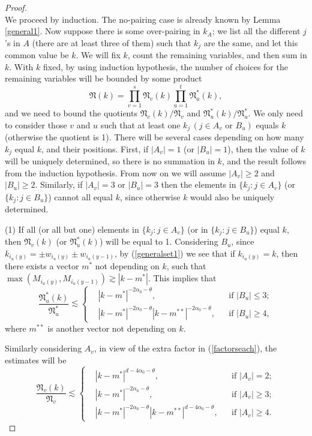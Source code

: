 \documentclass[11 pt,reqno]{amsart}
\theoremstyle{definition}
\theoremstyle{remark}
\numberwithin{equation}{section}
\newcommand{\Nf}{\mathfrak{N}}
\begin{document}
{\begin{proof}
\begin{equation}
\end{equation}We proceed by induction. The no-pairing case is already known by Lemma \ref{general1}. Now suppose there is some over-pairing in $k_A$; we list all the different $j$'s in $A$ (there are at least three of them) such that $k_j$ are the same, and let this common value be $k$. We will fix $k$, count the remaining variables, and then sum in $k$. With $k$ fixed, by using induction hypothesis, the number of choices for the remaining variables will be bounded by some product
\[\Nf(k)=\prod_{v=1}^s\Nf_v(k)\prod_{u=1}^t\Nf_u^*(k),\] and we need to bound the quotients $\Nf_v(k)/\Nf_v$ and $\Nf_u^*(k)/\Nf_u^*$. We only need to consider those $v$ and $u$ such that at least one $k_j\,(j\in A_v\textrm{ or }B_u)$ equals $k$ (otherwise the quotient is 1). There will be several cases depending on how many $k_j$ equal $k$, and their positions. First, if $|A_v|=1$ (or $|B_u|=1$), then the value of $k$ will be uniquely determined, so there is no summation in $k$, and the result follows from the induction hypothesis. From now on we will assume $|A_v|\geq 2$ and $|B_u|\geq 2$. Similarly, if $|A_v|=3$ or $|B_u|=3$ then the elements in $\{k_j:j\in A_v\}$ (or $\{k_j:j\in B_u\}$) cannot all equal $k$, since otherwise $k$ would also be uniquely determined.

(1) If all (or all but one) elements in $\{k_j:j\in A_v\}$ (or in $\{k_j:j\in B_u\}$) equal $k$, then $\Nf_v(k)$ (or $\Nf_u^*(k)$) will be equal to 1. Considering $B_u$, since $k_{i_u(y)}=\pm w_{i_u(y)}\pm w_{i_u(y-1)}$, by (\ref{generalset1}) we see that if $k_{i_u(y)}=k$, then there exists a vector $m^*$ not depending on $k$, such that $\max(M_{i_u(y)},M_{i_u(y-1)})\gtrsim|k-m^*|$. This implies that
\begin{equation}\label{quotientest1}\frac{\Nf_u^*(k)}{\Nf_u^*}\lesssim\left\{
\begin{aligned}&|k-m^{*}|^{-2\alpha_0-\theta},&&\textrm{if $|B_u|\leq 3$};\\
&|k-m^*|^{-2\alpha_0-\theta}|k-m^{**}|^{-2\alpha_0-\theta},&&\textrm{if $|B_u|\geq 4$},
\end{aligned}
\right.
\end{equation} where $m^{**}$ is another vector not depending on $k$.

Similarly considering $A_v$, in view of the extra factor in (\ref{factorseach}), the estimates will be
\begin{equation}\label{quotientest2}\frac{\Nf_v(k)}{\Nf_v}\lesssim\left\{
\begin{aligned}&|k-m^*|^{d-4\alpha_0-\theta},&&\textrm{if $|A_v|=2$};\\
&|k-m^*|^{-2\alpha_0-\theta},&&\textrm{if $|A_v|\geq 3$};\\
&|k-m^*|^{-2\alpha_0-\theta}|k-m^{**}|^{d-4\alpha_0-\theta},&&\textrm{if $|A_v|\geq 4$}.
\end{aligned}
\right.
\end{equation}


\end{proof}}
\end{document}
